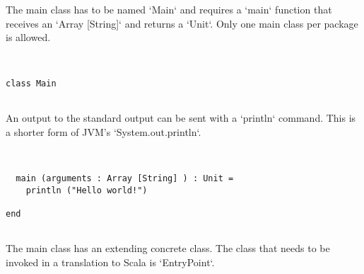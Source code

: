 \documentclass[12pt,a4paper]{article}
\begin{document}
The main class has to be named `Main` and requires a `main` function that receives an
`Array [String]` and returns a `Unit`. Only one main class per package is allowed.


\begin{lstlisting}


class Main


\end{lstlisting}

An output to the standard output can be sent with a `println` command.
This is a shorter form of JVM's `System.out.println`.


\begin{lstlisting}


  main (arguments : Array [String] ) : Unit =
    println ("Hello world!")

end


\end{lstlisting}

The main class has an extending concrete class. The class that needs to be invoked in a
translation to Scala is `EntryPoint`.


\begin{lstlisting}


\end{lstlisting}
\end{document}

